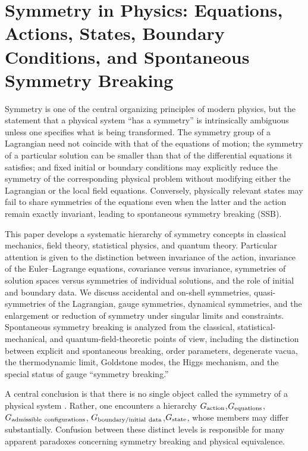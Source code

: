 \chapter {Symmetry in Physics: Equations, Actions, States, Boundary Conditions, and Spontaneous Symmetry Breaking}
Symmetry is one of the central organizing principles of modern physics, but the
statement that a physical system ``has a symmetry'' is intrinsically ambiguous
unless one specifies  what  is being transformed.  The symmetry group of a
Lagrangian need not coincide with that of the equations of motion; the symmetry
of a particular solution can be smaller than that of the differential equations
it satisfies; and fixed initial or boundary conditions may explicitly reduce
the symmetry of the corresponding physical problem without modifying either the
Lagrangian or the local field equations.  Conversely, physically relevant
states may fail to share symmetries of the equations even when the latter and
the action remain exactly invariant, leading to spontaneous symmetry breaking
(SSB).

This paper develops a systematic hierarchy of symmetry concepts in classical
mechanics, field theory, statistical physics, and quantum theory.  Particular
attention is given to the distinction between invariance of the action,
invariance of the Euler--Lagrange equations, covariance versus invariance,
symmetries of solution spaces versus symmetries of individual solutions, and
the role of initial and boundary data.  We discuss accidental and on-shell
symmetries, quasi-symmetries of the Lagrangian, gauge symmetries, dynamical
symmetries, and the enlargement or reduction of symmetry under singular limits
and constraints.  Spontaneous symmetry breaking is analyzed from the classical,
statistical-mechanical, and quantum-field-theoretic points of view, including
the distinction between explicit and spontaneous breaking, order parameters,
degenerate vacua, the thermodynamic limit, Goldstone modes, the Higgs
mechanism, and the special status of gauge ``symmetry breaking.''

A central conclusion is that there is no single object called  the symmetry of a physical system .  Rather, one encounters a hierarchy
$G_{\rm action}$,$G_{\rm equations}$,$G_{\rm admissible\ configurations}$,
$G_{\rm boundary/initial\ data}$,$G_{\rm state}$,
whose members may differ substantially.  Confusion between these distinct
levels is responsible for many apparent paradoxes concerning symmetry breaking
and physical equivalence.

